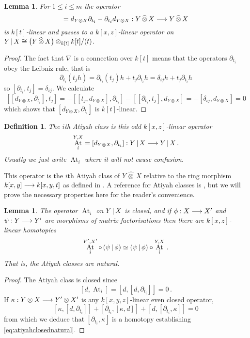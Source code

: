 \documentclass[english,letter paper,12pt,leqno]{article}
\newtheorem{lemma}[theorem]{Lemma}
\theoremstyle{example}
\newtheorem{definition}[theorem]{Definition}
\numberwithin{equation}{section}
\def\be{\begin{equation}}
\def\ee{\end{equation}}
\DeclareMathOperator{\At}{At}
\begin{document}
\begin{lemma} For $1 \le i \le m$ the operator
\be
[ d_{Y \otimes X}, \partial_{t_i} ] = d_{Y \otimes X} \partial_{t_i} - \partial_{t_i} d_{Y \otimes X}: Y \, \widehat{\otimes}\, X \lto Y \, \widehat{\otimes}\, X
\ee
is $k[t]$-linear and passes to a $k[x,z]$-linear operator on $Y \,|\, X \cong \left( Y \, \widehat{\otimes}\, X \right) \otimes_{k[t]} k[t]/(t)$.
\end{lemma}
\begin{proof}
The fact that $\nabla$ is a connection over $k[t]$ means that the operators $\partial_{t_i}$ obey the Leibniz rule, that is
\[
\partial_{t_i}( t_j h ) = \partial_{t_i}( t_j ) h + t_j \partial_{t_i} h = \delta_{ij} h + t_j \partial_{t_i} h
\]
so $[ \partial_{t_i}, t_j ] = \delta_{ij}$. We calculate
\[
[[d_{Y \otimes X}, \partial_{t_i}], t_j] = - [[t_j, d_{Y \otimes X}], \partial_{t_i}] - [[\partial_{t_i}, t_j], d_{Y \otimes X}] = - [ \delta_{ij}, d_{Y \otimes X}] = 0
\]
which shows that $[d_{Y \otimes X}, \partial_{t_i}]$ is $k[t]$-linear.
\end{proof}

\begin{definition}\label{defn:atiyah} The $i$th Atiyah class is this odd $k[x,z]$-linear operator
\[
\At^{Y,X}_i = [d_{Y \otimes X}, \partial_{t_i}]: Y \l X \lto Y \l X \,.
\]
Usually we just write $\At_i$ where it will not cause confusion.
\end{definition}

This operator is the $i$th Atiyah class of $Y \,\widehat{\otimes}\, X$ relative to the ring morphism $k[x,y] \longrightarrow k[x,y,t]$ as defined in \cite[Section 9]{dm1102.2957}. A reference for Atiyah classes is \cite{buchweitz_flenner}, but we will prove the necessary properties here for the reader's convenience.

\begin{lemma}\label{lemma:atiyahclosed} The operator $\At_i$ on $Y \,|\, X$ is closed, and if $\phi: X \longrightarrow X'$ and $\psi: Y \longrightarrow Y'$ are morphisms of matrix factorisations then there are $k[x,z]$-linear homotopies
\be\label{eq:atiyahclosednatural}
\At^{Y',X'}_i \circ \,( \psi \l \phi ) \simeq ( \psi \l \phi ) \circ \At^{Y,X}_i\,.
\ee
That is, the Atiyah classes are \emph{natural}.
\end{lemma}
\begin{proof}
The Atiyah class is closed since
\[
[d, \At_i] = [d, [d, \partial_{t_i}]] = 0\,.
\]
If $\kappa: Y \otimes X \longrightarrow Y' \otimes X'$ is any $k[x,y,z]$-linear even closed operator, 
\[
[ \kappa, [ d, \partial_{t_i} ] ] + [ \partial_{t_i}, [\kappa, d]] + [ d, [ \partial_{t_i}, \kappa] ] = 0
\]
from which we deduce that $[\partial_{t_i}, \kappa]$ is a homotopy establishing \eqref{eq:atiyahclosednatural}.
\end{proof}
\end{document}
